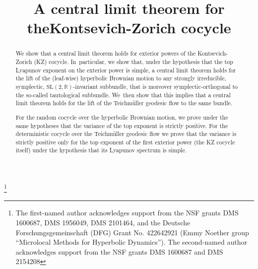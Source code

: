 \documentclass[JEP,XML,SOM,Unicode,published]{cedram}
\theoremstyle{plain}
\theoremstyle{definition}
\numberwithin{equation}{subsection}
\begin{document}
\title{A central limit theorem for the\nobreakspace Kontsevich-Zorich cocycle}

\author[\initial{H.} \lastname{Al-Saqban}]{ }
\address{Institut für Mathematik, Universität Paderborn,\\
Warburger Str. 100, 33098 Paderborn, Germany}

\author[\initial{G.} \lastname{Forni}]{ }
\address{Department of Mathematics, University of Maryland,\\
4176 Campus Drive - William E. Kirwan Hall,
College Park, MD 20742-4015, USA\\
\& Laboratoire AGM, CY Cergy Paris Université,\\
2 av. Adolphe Chauvin, 95302 Cergy-Pontoise, France}
\urladdr{}

\thanks{The first-named author acknowledges support from the NSF grants DMS 1600687, DMS 1956049, DMS 2101464, and the Deutsche Forschungsgemeinschaft (DFG) Grant No. 422642921 (Emmy Noether group “Microlocal Methods for Hyperbolic Dynamics”). The second-named author acknowledges support from the NSF grants DMS 1600687 and DMS 2154208}

\begin{abstract}
We show that a central limit theorem holds for exterior powers of the Kontsevich-Zorich (KZ) cocycle. In~particular, we show that, under the hypothesis that the top Lyapunov exponent on the exterior power is simple, a central limit theorem holds for the lift of the (leaf-wise) hyperbolic Brownian motion to any strongly irreducible, symplectic, $\mathrm{SL}(2,\mathbb R)$-invariant subbundle, that is moreover symplectic-orthogonal to the so-called tautological subbundle. We~then show that this implies that a central limit theorem holds for the lift of the Teichmüller geodesic flow to the same bundle.

For the random cocycle over the hyperbolic Brownian motion, we prove under the same hypotheses that the variance of the top exponent is strictly positive. For the deterministic cocycle over the
Teichmüller geodesic flow we prove that the variance is strictly positive only for the top exponent of the first exterior power (the KZ cocycle itself) under the hypothesis that its Lyapunov spectrum is simple.
\end{abstract}

\end{document}
